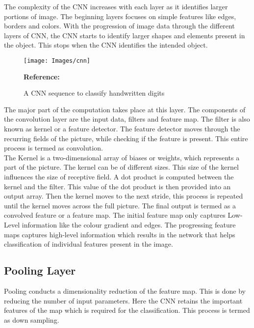 The complexity of the CNN increases with each layer as it identifies larger portions of image. The beginning layers focuses on simple features like edges, borders and colors. With the progression of image data through the different layers of CNN, the CNN starts to identify larger shapes and elements present in the object. This stops when the CNN identifies the intended object. \autocite{IBM:2020}

\begin{figure}  [H]
	\begin{center}
		\texttt{[image: Images/cnn]}
		\caption{A CNN sequence to classify handwritten digits} 
		\label{fig:A CNN sequence to classify handwritten digits}
		\footnotesize \textbf{Reference:} \autocite{KE:2022}
	\end{center}
\end{figure}



The major part of the computation takes place at this layer. The components of the convolution layer are the input data, filters and feature map. The filter is also known as kernel or a feature detector. The feature detector moves through the recurring fields of the picture, while checking if the feature is present. This entire process is termed as convolution.\\

The Kernel is a two-dimensional array of biases or weights, which represents a part of the picture. The kernel can be of different sizes. This size of the kernel influences the size of receptive field. A dot product is computed between the kernel and the filter. This value of the dot product is then provided into an output array. Then the kernel moves to the next stride, this process is repeated until the kernel moves across the full picture. The final output is termed as a convolved feature or a feature map. The initial feature map only captures Low-Level information like the colour gradient and edges. The progressing feature maps captures high-level information which results in the network that helps classification of individual features present in the image. \autocite{IBM:2020}

\subsection{Pooling Layer}

Pooling conducts a dimensionality reduction of the feature map. This is done by reducing the number of input parameters. Here the CNN retains the important features of the map which is required for the classification. This process is termed as down sampling.\\

